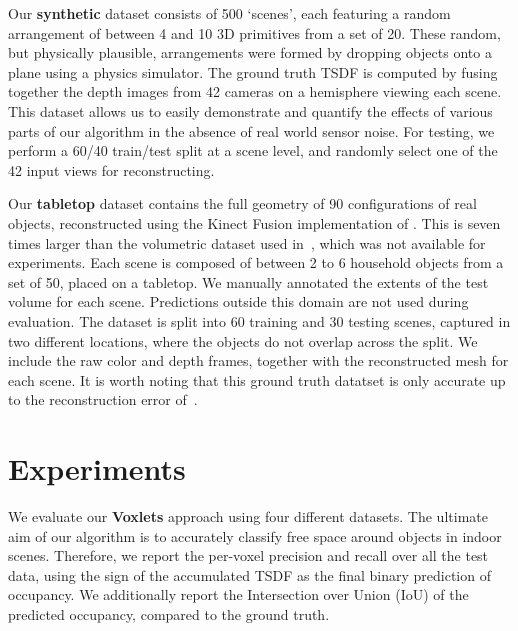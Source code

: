 \documentclass[10pt,twocolumn,letterpaper]{article}
\renewcommand{\paragraph}{\vspace{2pt}\noindent\textbf}
\begin{document}
Our \textbf{synthetic} dataset consists of 500 `scenes', each featuring a random arrangement of between 4 and 10 3D primitives from a set of 20.
These random, but physically plausible, arrangements were formed by dropping objects onto a plane using a physics simulator.
The ground truth TSDF is computed by fusing together the depth images from 42 cameras on a hemisphere viewing each scene.
This dataset allows us to easily demonstrate and quantify the effects of various parts of our algorithm in the absence of real world sensor noise.
For testing, we perform a 60/40 train/test split at a scene level, and randomly select one of the 42 input views for reconstructing.

Our \textbf{tabletop} dataset contains the full geometry of 90 configurations of real objects, reconstructed using the Kinect Fusion implementation of \cite{2014arXiv1410.0925P}.
This is seven times larger than the volumetric dataset used in~\cite{zheng-cvpr-2013}, which was not available for experiments.
Each scene is composed of between 2 to 6 household objects from a set of 50, placed on a tabletop.
We manually annotated the extents of the test volume for each scene.
Predictions outside this domain are not used during evaluation.
The dataset is split into 60 training and 30 testing scenes, captured in two different locations, where the objects do not overlap across the split.
We include the raw color and depth frames, together with the reconstructed mesh for each scene.
It is worth noting that this ground truth datatset is only accurate up to the reconstruction error of~\cite{2014arXiv1410.0925P}.



\section{Experiments}
We evaluate our {\bf Voxlets} approach using four different datasets.
The ultimate aim of our algorithm is to accurately classify free space around objects in indoor scenes.
Therefore, we report the per-voxel precision and recall over all the test data, using the sign of the accumulated TSDF as the final binary prediction of occupancy.
We additionally report the Intersection over Union (IoU) of the predicted occupancy, compared to the ground truth.
\end{document}
